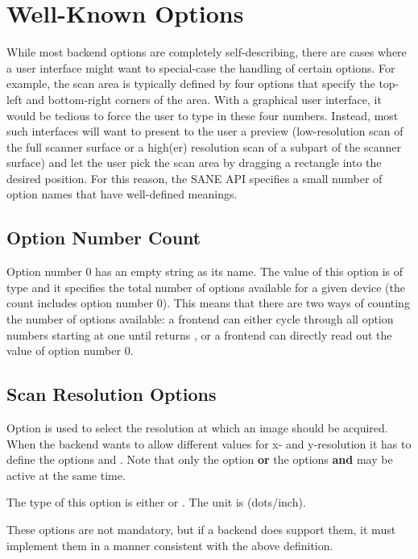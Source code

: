 \documentclass[11pt,DVIps]{report}
\begin{document}
\section{Well-Known Options}

While most backend options are completely self-describing, there are
cases where a user interface might want to special-case the handling
of certain options.  For example, the scan area is typically defined
by four options that specify the top-left and bottom-right corners of
the area.  With a graphical user interface, it would be tedious to
force the user to type in these four numbers.  Instead, most such
interfaces will want to present to the user a preview (low-resolution
scan of the full scanner surface or a high(er) resolution scan of a subpart
of the scanner surface) and let the user pick the scan area by
dragging a rectangle into the desired position.  For this reason, the
SANE API specifies a small number of option names that have
well-defined meanings.

\subsection{Option Number Count}

Option number 0 has an empty string as its name.  The value of this
option is of type  and it specifies the total
number of options available for a given device (the count includes
option number 0).  This means that there are two ways of counting the
number of options available: a frontend can either cycle through all
option numbers starting at one until
 returns , or a
frontend can directly read out the value of option number 0.

\subsection{Scan Resolution Options}

\begin{changebar}
Option  is used to select the resolution at which an
image should be acquired. When the backend wants to allow different
values for x- and y-resolution it has to define the options
 and . Note that only
the option  {\bf or} the options
 {\bf and}  may be active at the
same time.

The type of this option is either  or
.  The unit is  (dots/inch).

These options are not mandatory, but if a backend does support them, it
must implement them in a manner consistent with the above definition.
\end{changebar}
\end{document}
